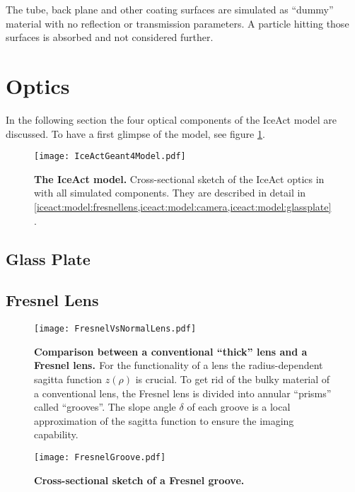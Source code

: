The tube, back plane and other coating surfaces are simulated as \enquote{dummy} material with no reflection or transmission parameters. A particle hitting those surfaces is absorbed and not considered further.

\section{Optics}

In the following section the four optical components of the IceAct \geant model are discussed. To have a first glimpse of the model, see figure \ref{iceact:model:cut}.
\begin{figure}[h]
	\centering
	\texttt{[image: IceActGeant4Model.pdf]}
	\caption[IceAct \geant model]{\textbf{The IceAct \geant model.} Cross-sectional sketch of the IceAct optics in \geant with all simulated components. They are described in detail in \cref{iceact:model:fresnellens,iceact:model:camera,iceact:model:glassplate}.}
	\label{iceact:model:cut}	
\end{figure}

\subsection{Glass Plate}\label{iceact:model:glassplate}


\subsection{Fresnel Lens}\label{iceact:model:fresnellens}

\begin{figure}[h]
	\centering
	\texttt{[image: FresnelVsNormalLens.pdf]}
	\caption[Comparison conventional vs. Fresnel lens]{\textbf{Comparison between a conventional \enquote{thick} lens and a Fresnel lens. \cite{famous:eichler}} For the functionality of a lens the radius-dependent sagitta function $z(\rho)$ is crucial. To get rid of the bulky material of a conventional lens, the Fresnel lens is divided into annular \enquote{prisms} called \enquote{grooves}. The slope angle $\delta$ of each groove is a local approximation of the sagitta function to ensure the imaging capability.}
	\label{iceact:model:fresnelvsthick}	
\end{figure}

\begin{figure}[h]
	\centering
	\texttt{[image: FresnelGroove.pdf]}
	\caption[Fresnel groove]{\textbf{Cross-sectional sketch of a Fresnel groove. \cite{famous:eichler}}}
	\label{iceact:model:fresnelgroove}	
\end{figure}

